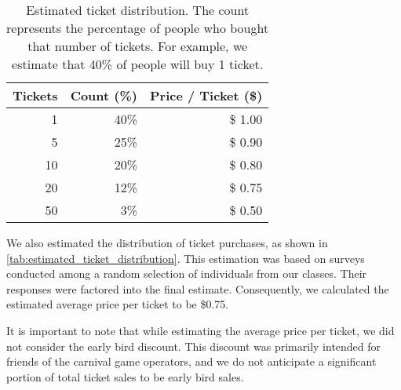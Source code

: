 \begin{table}[H]
	\caption{Estimated ticket distribution. The count represents the percentage of people who bought that number of tickets. For example, we estimate that 40\% of people will buy 1 ticket.}
	\begin{tabular}{r|rr}
	\multicolumn{1}{l|}{\textbf{Tickets}} & \multicolumn{1}{l}{\textbf{Count (\%)}} & \multicolumn{1}{l}{\textbf{Price / Ticket (\$)}} \\ \hline
	1                                     & 40\%                                    & \$ 1.00                                          \\
	5                                     & 25\%                                    & \$ 0.90                                          \\
	10                                    & 20\%                                    & \$ 0.80                                          \\
	20                                    & 12\%                                    & \$ 0.75                                          \\
	50                                    & 3\%                                     & \$ 0.50
	\end{tabular}
	\label{tab:estimated_ticket_distribution}
\end{table}

We also estimated the distribution of ticket purchases, as shown in \autoref{tab:estimated_ticket_distribution}. This estimation was based on surveys conducted among a random selection of individuals from our classes. Their responses were factored into the final estimate. Consequently, we calculated the estimated average price per ticket to be \$0.75.

It is important to note that while estimating the average price per ticket, we did not consider the early bird discount. This discount was primarily intended for friends of the carnival game operators, and we do not anticipate a significant portion of total ticket sales to be early bird sales.
